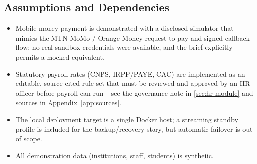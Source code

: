 \subsection{Assumptions and Dependencies}
\begin{itemize}[leftmargin=1.4em]
  \item Mobile-money payment is demonstrated with a disclosed simulator that
    mimics the MTN MoMo / Orange Money request-to-pay and signed-callback
    flow; no real sandbox credentials were available, and the brief
    explicitly permits a mocked equivalent.
  \item Statutory payroll rates (CNPS, IRPP/PAYE, CAC) are implemented as an
    editable, source-cited rule set that must be reviewed and approved by an
    HR officer before payroll can run -- see the governance note in
    \cref{sec:hr-module} and sources in Appendix~\ref{app:sources}.
  \item The local deployment target is a single Docker host; a streaming
    standby profile is included for the backup/recovery story, but automatic
    failover is out of scope.
  \item All demonstration data (institutions, staff, students) is synthetic.
\end{itemize}

